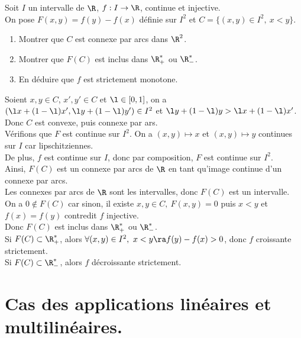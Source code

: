 \documentclass[11pt]{article}
\begin{document}
\begin{ex}{}{}
    Soit $I$ un intervalle de $\R$, $f:I\to\R$, continue et injective.\\
    On pose $F(x,y)=f(y)-f(x)$ définie sur $I^2$ et $C=\{(x,y)\in I^2, ~ x<y\}$.
    \begin{enumerate}
        \item Montrer que $C$ est connexe par arcs dans $\R^2$.
        \item Montrer que $F(C)$ est inclus dans $\R^*_+$ ou $\R^*_-$.
        \item En déduire que $f$ est strictement monotone.
    \end{enumerate}
    \tcblower
     Soient $x,y\in C$, $x',y'\in C$ et $\l\in[0,1]$, on a $(\l x + (1-\l) x', \l y + (1-\l) y') \in I^2$ et $\l y + (1-\l)y > \l x + (1-\l)x'$.\\
    Donc $C$ est convexe, puis connexe par ars.\\
     Vérifions que $F$ est continue sur $I^2$. On a $(x,y)\mapsto x$ et $(x,y)\mapsto y$ continues sur $I$ car lipschitziennes.\\
    De plus, $f$ est continue sur $I$, donc par composition, $F$ est continue sur $I^2$.\\
    Ainsi, $F(C)$ est un connexe par arcs de $\R$ en tant qu'image continue d'un connexe par arcs.\\
    Les connexes par arcs de $\R$ sont les intervalles, donc $F(C)$ est un intervalle.\\
    On a $0\notin F(C)$ car sinon, il existe $x,y\in C, ~ F(x,y)=0$ puis $x<y$ et $f(x)=f(y)$ contredit $f$ injective.\\
    Donc $F(C)$ est inclus dans $\R^*_+$ ou $\R^*_-$.\\
     Si $F(C)\subset\R_+^*$, alors $\forall (x,y) \in I^2, ~ x < y \ra f(y) - f(x) > 0$, donc $f$ croissante strictement.\\
    Si $F(C)\subset\R_-^*$, alors $f$ décroissante strictement.
\end{ex}
 
\pagebreak

\section{Cas des applications linéaires et multilinéaires.}
\end{document}
